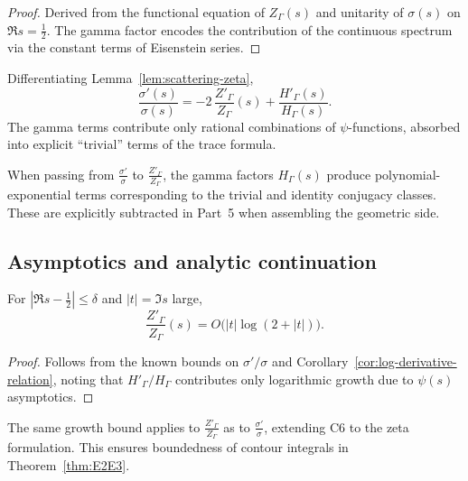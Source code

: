 \begin{proof}\relax
Derived from the functional equation of $Z_\Gamma(s)$ and unitarity of $\sigma(s)$ on $\Re s=\tfrac12$. The gamma factor encodes the contribution of the continuous spectrum via the constant terms of Eisenstein series. \relax
\end{proof}

\begin{corollary}
\label{cor:log-derivative-relation}
Differentiating Lemma~\ref{lem:scattering-zeta},
\[
\frac{\sigma'(s)}{\sigma(s)}
= -2\,\frac{Z'_\Gamma}{Z_\Gamma}(s)
+ \frac{H'_\Gamma(s)}{H_\Gamma(s)}.
\]
The gamma terms contribute only rational combinations of $\psi$-functions, absorbed into explicit “trivial” terms of the trace formula. \relax
\end{corollary}

\begin{remark}
\label{rem:trivial-terms}
When passing from $\frac{\sigma'}{\sigma}$ to $\frac{Z'_\Gamma}{Z_\Gamma}$, the gamma factors $H_\Gamma(s)$ produce polynomial-exponential terms corresponding to the trivial and identity conjugacy classes. These are explicitly subtracted in Part~5 when assembling the geometric side. \relax
\end{remark}

\subsection{Asymptotics and analytic continuation}
\label{subsec:ch4-part4-asymptotics} \relax

\begin{theorem}
\label{thm:Zprime-growth}
For $|\Re s-\tfrac12|\le \delta$ and $|t|=\Im s$ large,
\[
\frac{Z'_\Gamma}{Z_\Gamma}(s) = O\big(|t|\log(2+|t|)\big).
\]
\end{theorem}

\begin{proof}\relax
Follows from the known bounds on $\sigma'/\sigma$ and Corollary~\ref{cor:log-derivative-relation}, noting that $H'_\Gamma/H_\Gamma$ contributes only logarithmic growth due to $\psi(s)$ asymptotics. \relax
\end{proof}

\begin{invariant}
The same growth bound applies to $\frac{Z'_\Gamma}{Z_\Gamma}$ as to $\frac{\sigma'}{\sigma}$, extending C6 to the zeta formulation. This ensures boundedness of contour integrals in Theorem~\ref{thm:E2E3}. \relax
\end{invariant}

